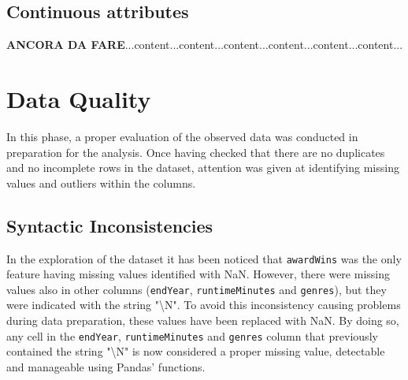 \subsection{Continuous attributes}
\textbf{ANCORA DA FARE}...content...content...content...content...content...content...


\section{Data Quality}\label{sec:data_quality}
In this phase, a proper evaluation of the observed data was conducted in preparation for the analysis.
Once having checked that there are no duplicates and no incomplete rows in the dataset, attention was given at identifying missing values and outliers within the columns.



\subsection{Syntactic Inconsistencies}
In the exploration of the dataset it has been noticed that \texttt{awardWins} was the only feature having missing values identified with NaN.
However, there were missing values also in other columns (\texttt{endYear}, \texttt{runtimeMinutes} and \texttt{genres}), but they were indicated with the string "\textbackslash N".
To avoid this inconsistency causing problems during data preparation, these values have been replaced with NaN.
By doing so, any cell in the \texttt{endYear}, \texttt{runtimeMinutes} and \texttt{genres} column that previously contained the string "\textbackslash N" is now considered a proper missing value, detectable and manageable using Pandas' functions.



